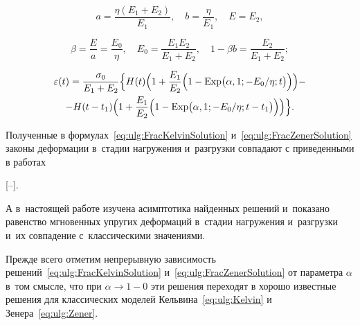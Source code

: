 \begin{itemize}
$$

a=\frac{\eta(E_{1}+E_{2})}{E_{1}},\quad

b=\frac{\eta}{E_{1}},\quad 

 E=E_{2},$$

$$\beta=\frac E a= \frac{E_{0}} \eta,\quad 

E_{0}=\frac{E_{1}E_{2}}{E_{1}+E_{2}},\quad  

1-\beta b=\frac{E_{2}}{E_{1}+E_{2}};$$ 

\begin{multline}\label{eq:ulg:FracZenerSolution}

\varepsilon(t)=\frac{\sigma_{0}}{E_{1}+E_{2}}

\Bigl\{

H(t)\Bigl(

1+\frac{E_{1}}{E_{2}}\Bigl(1-  \mathop{\rm Exp}\nolimits  \bigl(\alpha, 1;- {E_{0}}/{\eta};t\bigl)\Bigr)\Bigr)-\\

-H(t-t_{1})\Bigl(1+\frac{E_{1}}{E_{2}}\Bigr(1-  \mathop{\rm Exp}\nolimits  \bigl(\alpha, 1;-{E_{0}}/{\eta};t-t_{1}\bigl)\Bigr)

\Bigr)

\Bigr\}.

\end{multline}



\end{itemize}





Полученные в формулах~\eqref{eq:ulg:FracKelvinSolution} и~\eqref{eq:ulg:FracZenerSolution} законы деформации в~стадии нагружения и~разгрузки совпадают с приведенными в работах

[--]. 

{А в~настоящей работе} изучена асимптотика найденных решений и~показано равенство мгновенных упругих деформаций в~стадии нагружения и~разгрузки и~их совпадение с~классическими значениями.



Прежде всего отметим непрерывную зависимость решений~\eqref{eq:ulg:FracKelvinSolution} и~\eqref{eq:ulg:FracZenerSolution} от параметра $\alpha$ в~том смысле, что при $\alpha\rightarrow1-0$ эти решения переходят в хорошо известные решения для классических моделей Кельвина~\eqref{eq:ulg:Kelvin} и Зенера~\eqref{eq:ulg:Zener}.



